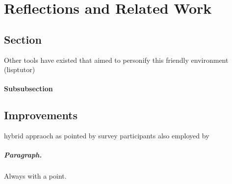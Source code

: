 \chapter{Reflections and Related Work}
\label{chap:reflection}
\section{Section}
Other tools have existed that aimed to personify this friendly environment (lisptutor)
\subsubsection{Subsubsection}

\section{Improvements}
hybrid appraoch as pointed by survey participants also employed by \cite{harris_team, team_meta, }
\paragraph{Paragraph.} Always with a point.
